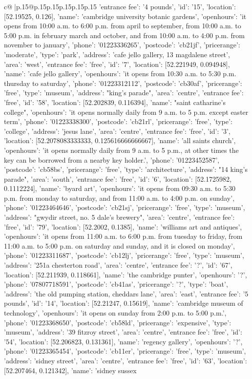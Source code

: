 \documentclass{article}
\begin{document}
{\begin{supertabular}{c@{$\;$}|p{.15\linewidth}@{}p{.15\linewidth}p{.15\linewidth}p{.15\linewidth}p{.15\linewidth}p{.15\linewidth}}
{{{'entrance fee': '4 pounds', 'id': '15', 'location': [52.19525, 0.126], 'name': 'cambridge university botanic gardens', 'openhours': 'it opens from 10:00 a.m. to 6:00 p.m. from april to september, from 10:00 a.m. to 5:00 p.m. in february march and october, and from 10:00 a.m. to 4:00 p.m. from november to january', 'phone': '01223336265', 'postcode': 'cb21jf', 'pricerange': 'moderate', 'type': 'park'}, {'address': 'cafe jello gallery, 13 magdalene street', 'area': 'west', 'entrance fee': 'free', 'id': '7', 'location': [52.221949, 0.094948], 'name': 'cafe jello gallery', 'openhours': 'it opens from 10:30 a.m. to 5:30 p.m. thursday to saturday', 'phone': '01223312112', 'postcode': 'cb30af', 'pricerange': 'free', 'type': 'museum'}, {'address': "king's parade", 'area': 'centre', 'entrance fee': 'free', 'id': '58', 'location': [52.202839, 0.116394], 'name': "saint catharine's college", 'openhours': 'it opens normally daily from 9 a.m. to 5 p.m. except easter term', 'phone': '01223338300', 'postcode': 'cb21rl', 'pricerange': 'free', 'type': 'college'}, {'address': 'jesus lane', 'area': 'centre', 'entrance fee': 'free', 'id': '3', 'location': [52.2078083333333, 0.125616666666667], 'name': 'all saints church', 'openhours': 'it opens normally daily from 9 a.m. to 5 p.m., at other times the key can be borrowed from a nearby key holder.', 'phone': '01223452587', 'postcode': 'cb58bs', 'pricerange': 'free', 'type': 'architecture'}, {'address': "14 king's parade", 'area': 'south', 'entrance fee': 'free', 'id': '6', 'location': [52.1725982, 0.1112224], 'name': 'byard art', 'openhours': 'it opens from 09:30 a.m. to 5:30 p.m. from monday to saturday, and from 11:00 a.m. to 4:00 p.m. on sunday', 'phone': '01223464646', 'postcode': 'cb21sj', 'pricerange': 'free', 'type': 'museum'}, {'address': "gwydir street, no. 5 dale's brewery", 'area': 'centre', 'entrance fee': 'free', 'id': '79', 'location': [52.2002, 0.1385], 'name': 'williams art and antiques', 'openhours': 'it opens from 11:00 a.m. to 6:00 p.m. from tuesday to friday, from 11:00 a.m. to 5:00 p.m. on saturday and sunday, and it is closed on monday', 'phone': '01223311687', 'postcode': 'cb12lj', 'pricerange': 'free', 'type': 'museum'}, {'address': '251a chesterton road', 'area': 'centre', 'entrance fee': '?', 'id': '67', 'location': [52.211939, 0.118661], 'name': 'the cambridge punter', 'openhours': '?', 'phone': '07807718591', 'postcode': 'cb41as', 'pricerange': '?', 'type': 'boat'}, {'address': 'the old pumping station, cheddars lane', 'area': 'east', 'entrance fee': '5 pounds', 'id': '14', 'location': [52.21247, 0.15619], 'name': 'cambridge museum of technology', 'openhours': 'it opens on sunday from 2:00 p.m. to 5:00 p.m.', 'phone': '01223368650', 'postcode': 'cb58ld', 'pricerange': 'expensive', 'type': 'museum'}, {'address': '39 fitzroy street', 'area': 'centre', 'entrance fee': 'free', 'id': '54', 'location': [52.206823, 0.131361], 'name': 'regency gallery', 'openhours': '?', 'phone': '01223365454', 'postcode': 'cb11er', 'pricerange': 'free', 'type': 'museum'}, {'address': 'sidney street', 'area': 'centre', 'entrance fee': 'free', 'id': '63', 'location': [52.207464, 0.121342], 'name': 'sidney sussex }}}
\end{supertabular}}
\end{document}
